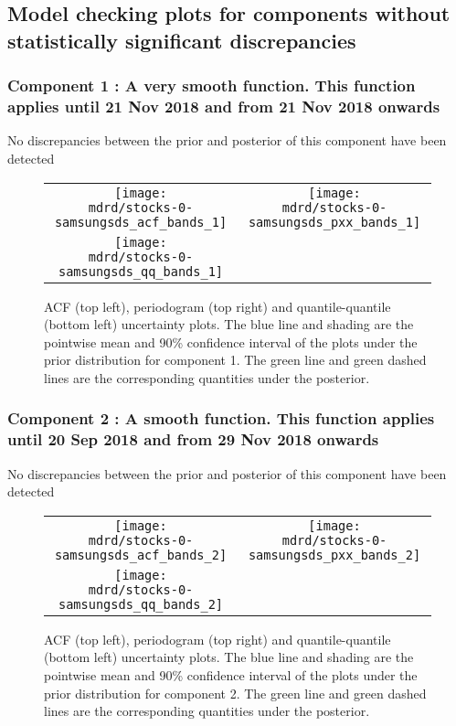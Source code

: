 \documentclass{article} %
\begin{document}
\subsection{Model checking plots for components without statistically significant discrepancies}

\subsubsection{Component 1 : A very smooth function. This function applies until 21 Nov 2018 and from 21 Nov 2018 onwards}

No discrepancies between the prior and posterior of this component have been detected

\begin{figure}[H]
\newcommand{\wmgd}{0.5\columnwidth}
\newcommand{\hmgd}{3.0cm}
\newcommand{\mdrd}{stocks-0-samsungsds}
\newcommand{\mbm}{\hspace{-0.3cm}}
\begin{tabular}{cc}
\mbm \texttt{[image: \\mdrd/stocks-0-samsungsds\_acf\_bands\_1]} & \texttt{[image: \\mdrd/stocks-0-samsungsds\_pxx\_bands\_1]} \\
\mbm \texttt{[image: \\mdrd/stocks-0-samsungsds\_qq\_bands\_1]}
\end{tabular}
\caption{
ACF (top left), periodogram (top right) and quantile-quantile (bottom left) uncertainty plots.
The blue line and shading are the pointwise mean and 90\% confidence interval of the plots under the prior distribution for component 1.
The green line and green dashed lines are the corresponding quantities under the posterior.}
\label{fig:check1}
\end{figure}

\subsubsection{Component 2 : A smooth function. This function applies until 20 Sep 2018 and from 29 Nov 2018 onwards}

No discrepancies between the prior and posterior of this component have been detected

\begin{figure}[H]
\newcommand{\wmgd}{0.5\columnwidth}
\newcommand{\hmgd}{3.0cm}
\newcommand{\mdrd}{stocks-0-samsungsds}
\newcommand{\mbm}{\hspace{-0.3cm}}
\begin{tabular}{cc}
\mbm \texttt{[image: \\mdrd/stocks-0-samsungsds\_acf\_bands\_2]} & \texttt{[image: \\mdrd/stocks-0-samsungsds\_pxx\_bands\_2]} \\
\mbm \texttt{[image: \\mdrd/stocks-0-samsungsds\_qq\_bands\_2]}
\end{tabular}
\caption{
ACF (top left), periodogram (top right) and quantile-quantile (bottom left) uncertainty plots.
The blue line and shading are the pointwise mean and 90\% confidence interval of the plots under the prior distribution for component 2.
The green line and green dashed lines are the corresponding quantities under the posterior.}
\label{fig:check2}
\end{figure}
\end{document}
